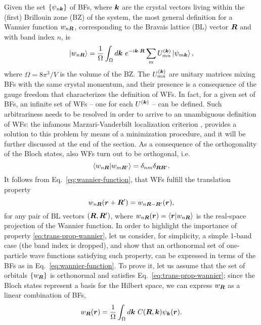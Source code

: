Given the set $\{ \psi_{n{\bm k}} \}$ of BFs, where ${\bm k}$ are the crystal vectors living within the (first) Brillouin zone (BZ) of the system, the most general definition for a Wannier function $w_{n{\bm R}}$, corresponding to the Bravais lattice (BL) vector ${\bm R}$ and with band index $n$, is
%
\begin{equation}
    \ket{w_{n{\bm R}}} = \frac{1}{\Omega} \int_{\Omega} d{\bm k} \ e^{-i{\bm k} \cdot {\bm R}} \sum_m U^{({\bm k})}_{mn} \ket{\psi_{m{\bm k}}} ,
    \label{eq:wannier-function}
\end{equation}
%
where $\Omega = 8\pi^3 / V$ is the volume of the BZ. The $U^{({\bm k})}_{mn}$ are unitary matrices mixing BFs with the same crystal momentum, and their presence is a consequence of the gauge freedom that characterizes the definition of WFs. In fact, for a given set of BFs, an infinite set of WFs -- one for each $U^{({\bm k})}$ -- can be defined. Such arbitrariness needs to be resolved in order to arrive to an unambiguous definition of WFs: the infamous Marzari-Vanderbilt localization criterion \cite{marzari_maximally_1997}, provides a solution to this problem by means of a minimization procedure, and it will be further discussed at the end of the section. As a consequence of the orthogonality of the Bloch states, also WFs turn out to be orthogonal, i.e.
%
\begin{equation}
    \braket{w_{n{\bm R}} | w_{m{\bm R}'}} = \delta_{nm} \delta_{{\bm R} {\bm R}'} .
    \label{eq:orthogonality-wannier}
\end{equation}
%
It follows from Eq.~\eqref{eq:wannier-function}, that WFs fulfill the translation property
%
\begin{equation}
    w_{n{\bm R}}({\bm r} + {\bm R}') = w_{n{\bm R} - {\bm R}'}({\bm r}) ,
    \label{eq:trans-prop-wannier}
\end{equation}
%
for any pair of BL vectors $({\bm R},{\bm R}')$, where $w_{n{\bm R}}({\bm r}) = \braket{{\bm r}|w_{n{\bm R}}}$ is the real-space projection of the Wannier function. In order to highlight the importance of property \eqref{eq:trans-prop-wannier}, let us consider, for simplicity, a simple 1-band case (the band index is dropped), and show that an orthonormal set of one-particle wave functions satisfying such property, can be expressed in terms of the BFs as in Eq.~\eqref{eq:wannier-function}. To prove it, let us assume that the set of orbitals $\{ w_{{\bm R}} \}$ is orthonormal and satisfies Eq.~\eqref{eq:trans-prop-wannier}; since the Bloch states represent a basis for the Hilbert space, we can express $w_{{\bm R}}$ as a linear combination of BFs,
%
\begin{equation}
    w_{{\bm R}}({\bm r}) = \frac{1}{\Omega} \int_{\Omega} d{\bm k} \ C({\bm R},{\bm k}) \psi_{{\bm k}}({\bm r}) .
    \label{eq:wannier-bloch-linear-combination}
\end{equation}

